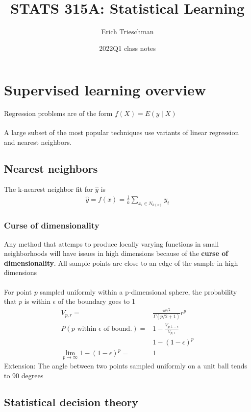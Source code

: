 \documentclass{article}
\title{STATS 315A: Statistical Learning}
\author{Erich Trieschman}
\date{2022Q1 class notes}
\begin{document}
\maketitle

\tableofcontents

\section{Supervised learning overview}
Regression problems are of the form $f(X) = E(y \mid X)$\\\\
A large subset of the most popular techniques use variants of linear regression and nearest neighbors. 

\subsection{Nearest neighbors}
The k-nearest neighbor fit for $\hat{y}$ is 
\begin{align*}
  \hat{y} = f(x) = \frac{1}{k}\sum_{x_i \in N_{k(x)}}y_i
\end{align*}
\subsubsection{Curse of dimensionality}
Any method that attemps to produce locally varying functions in small neighborhoods will have issues in high dimensions because of the \textbf{curse of dimensionality}. All sample points are close to an edge of the sample in high dimensions\\\\
For point $p$ sampled uniformly within a p-dimensional sphere, the probability that $p$ is within $\epsilon$ of the boundary goes to 1
\begin{align*}
  V_{p,r} =& \frac{\pi^{p/2}}{\Gamma(p/2 + 1)}r^p\\
  P(p \textrm{ within } \epsilon \textrm{ of bound.}) =& 1 - \frac{V_{p, 1-\epsilon}}{V_{p, 1}}\\
  & 1 - (1-\epsilon)^p\\
  \lim_{p\rightarrow \infty} 1 - (1 - \epsilon)^p =& 1
\end{align*}
Extension: The angle between two points sampled uniformly on a unit ball tends to 90 degrees

\subsection{Statistical decision theory}
\end{document}
